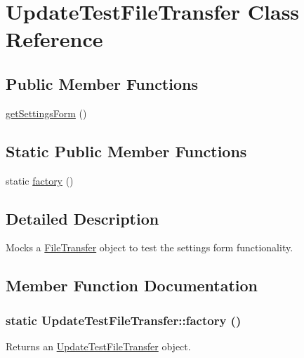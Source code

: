\hypertarget{classUpdateTestFileTransfer}{
\section{UpdateTestFileTransfer Class Reference}
\label{classUpdateTestFileTransfer}
}
\subsection*{Public Member Functions}
\begin{DoxyCompactItemize}
\item 
\hyperlink{classUpdateTestFileTransfer_a0c87952e9cff04813489db3764c9ce27}{getSettingsForm} ()
\end{DoxyCompactItemize}
\subsection*{Static Public Member Functions}
\begin{DoxyCompactItemize}
\item 
static \hyperlink{classUpdateTestFileTransfer_a6c8e4dc58345fbc8b8c545bfb6e6b3b9}{factory} ()
\end{DoxyCompactItemize}


\subsection{Detailed Description}
Mocks a \hyperlink{classFileTransfer}{FileTransfer} object to test the settings form functionality. 

\subsection{Member Function Documentation}
\hypertarget{classUpdateTestFileTransfer_a6c8e4dc58345fbc8b8c545bfb6e6b3b9}{
\subsubsection[{factory}]{\setlength{\rightskip}{0pt plus 5cm}static UpdateTestFileTransfer::factory ()}}
\label{classUpdateTestFileTransfer_a6c8e4dc58345fbc8b8c545bfb6e6b3b9}
Returns an \hyperlink{classUpdateTestFileTransfer}{UpdateTestFileTransfer} object.

